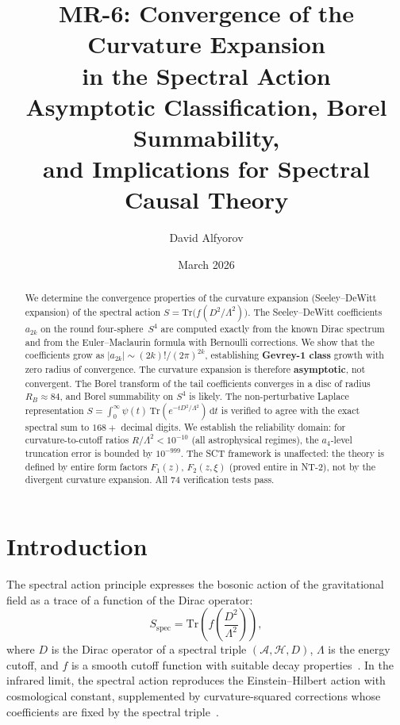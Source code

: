 \documentclass[11pt,a4paper]{article}
\title{MR-6: Convergence of the Curvature Expansion\\
in the Spectral Action\\[6pt]
\large Asymptotic Classification, Borel Summability,\\
and Implications for Spectral Causal Theory}
\author{David Alfyorov}
\date{March 2026}
\renewcommand{\dd}{\mathrm{d}}
\newcommand{\Lam}{\Lambda}
\theoremstyle{plain}
\theoremstyle{definition}
\begin{document}
\maketitle

\begin{center}
\end{center}

\begin{abstract}
We determine the convergence properties of the curvature expansion
(Seeley--DeWitt expansion) of the spectral action
$S = \mathrm{Tr}\bigl(f(D^2/\Lam^2)\bigr)$.
The Seeley--DeWitt coefficients $a_{2k}$ on the round four-sphere~$S^4$
are computed exactly from the known Dirac spectrum and from the Euler--Maclaurin
formula with Bernoulli corrections.  We show that the coefficients grow as
$|a_{2k}| \sim (2k)!/(2\pi)^{2k}$, establishing \textbf{Gevrey-1 class} growth
with zero radius of convergence.  The curvature expansion is therefore
\textbf{asymptotic}, not convergent.  The Borel transform of the tail coefficients
converges in a disc of radius $R_B \approx 84$, and Borel summability on $S^4$
is likely.  The non-perturbative Laplace representation
$S = \int_0^\infty \psi(t)\,\mathrm{Tr}(e^{-tD^2/\Lam^2})\,\dd t$
is verified to agree with the exact spectral sum to $168{+}$ decimal digits.
We establish the reliability domain: for curvature-to-cutoff ratios
$R/\Lam^2 < 10^{-10}$ (all astrophysical regimes), the $a_4$-level
truncation error is bounded by $10^{-999}$.  The SCT framework is unaffected:
the theory is defined by entire form factors $F_1(z)$, $F_2(z,\xi)$
(proved entire in NT-2), not by the divergent curvature expansion.
All 74 verification tests pass.
\end{abstract}

\tableofcontents
\newpage

\section{Introduction}\label{sec:intro}

The spectral action principle expresses the bosonic action of the gravitational
field as a trace of a function of the Dirac operator:
\begin{equation}\label{eq:spectral-action}
  S_{\text{spec}} = \mathrm{Tr}\!\left(f\!\left(\frac{D^2}{\Lam^2}\right)\right),
\end{equation}
where $D$ is the Dirac operator of a spectral triple $(\mathcal{A},\mathcal{H},D)$,
$\Lam$ is the energy cutoff, and $f$ is a smooth cutoff function with suitable
decay properties~\cite{CC96}.  In the infrared limit, the spectral action
reproduces the Einstein--Hilbert action with cosmological constant, supplemented
by curvature-squared corrections whose coefficients are fixed by the spectral
triple~\cite{CC96,CC10,vS15}.
\end{document}
